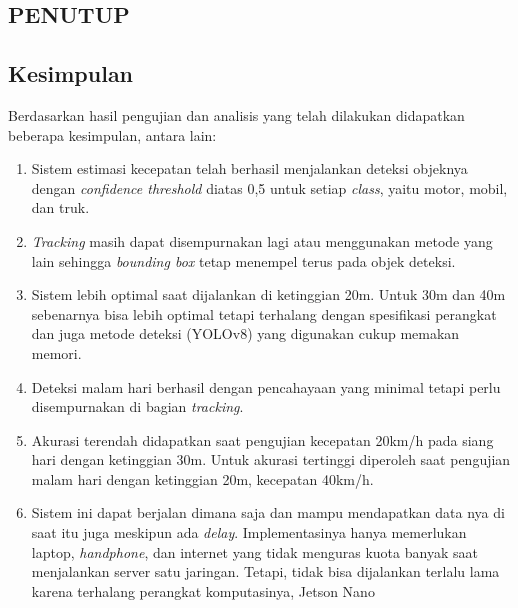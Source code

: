 \begin{spacing}{1.2}
	\chapter{PENUTUP}
	\label{sec:chap5_penutup}
\end{spacing}
\vspace{4ex}

\section{Kesimpulan}
\label{sec:sec4_kesimpulan}
\vspace{1ex}
Berdasarkan hasil pengujian dan analisis yang telah dilakukan didapatkan beberapa kesimpulan, antara lain:
\begin{enumerate}
    \item Sistem estimasi kecepatan telah berhasil menjalankan deteksi objeknya dengan \emph{confidence threshold} diatas 0,5 untuk setiap \emph{class}, yaitu motor, mobil, dan truk.
    \item \emph{Tracking} masih dapat disempurnakan lagi atau menggunakan metode yang lain sehingga \emph{bounding box} tetap menempel terus pada objek deteksi.
    \item Sistem lebih optimal saat dijalankan di ketinggian 20m. Untuk 30m dan 40m sebenarnya bisa lebih optimal tetapi terhalang dengan spesifikasi perangkat dan juga metode deteksi (YOLOv8) yang digunakan cukup memakan memori.
    \item Deteksi malam hari berhasil dengan pencahayaan yang minimal tetapi perlu disempurnakan di bagian \emph{tracking}.
    \item Akurasi terendah didapatkan saat pengujian kecepatan 20km/h pada siang hari dengan ketinggian 30m. Untuk akurasi tertinggi diperoleh saat pengujian malam hari dengan ketinggian 20m, kecepatan 40km/h.
    \item Sistem ini dapat berjalan dimana saja dan mampu mendapatkan data nya di saat itu juga meskipun ada \emph{delay}. Implementasinya hanya memerlukan laptop, \emph{handphone}, dan internet yang tidak menguras kuota banyak saat menjalankan server satu jaringan. Tetapi, tidak bisa dijalankan terlalu lama karena terhalang perangkat komputasinya, Jetson Nano
\end{enumerate}
